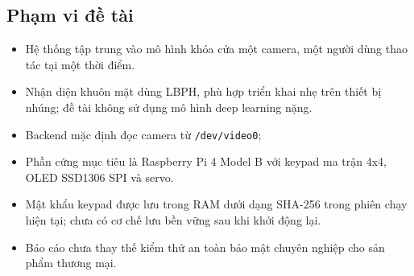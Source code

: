 \subsection{Phạm vi đề tài}

\begin{itemize}
    \item Hệ thống tập trung vào mô hình khóa cửa một camera, một người dùng thao tác tại một thời điểm.
    \item Nhận diện khuôn mặt dùng LBPH, phù hợp triển khai nhẹ trên thiết bị nhúng; đề tài không sử dụng mô hình deep learning nặng.
    \item Backend mặc định đọc camera từ \texttt{/dev/video0}; 
    \item Phần cứng mục tiêu là Raspberry Pi 4 Model B với keypad ma trận 4x4, OLED SSD1306 SPI và servo.
    \item Mật khẩu keypad được lưu trong RAM dưới dạng SHA-256 trong phiên chạy hiện tại; chưa có cơ chế lưu bền vững sau khi khởi động lại.
    \item Báo cáo chưa thay thế kiểm thử an toàn bảo mật chuyên nghiệp cho sản phẩm thương mại.
\end{itemize}
